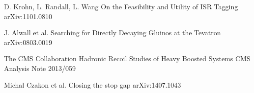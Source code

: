\begin{thebibliography}{2}
             {D. Krohn, L. Randall, L. Wang}
             {On the Feasibility and Utility of ISR Tagging}
             {arXiv:1101.0810}

             {J. Alwall et al.}
             {Searching for Directly Decaying Gluinos at the Tevatron}
             {arXiv:0803.0019}

             {The CMS Collaboration}
             {Hadronic Recoil Studies of Heavy Boosted Systems}
             {CMS Analysis Note 2013/059}


             {Michal Czakon et al.}
             {Closing the stop gap}
             {arXiv:1407.1043}

\end{thebibliography}




